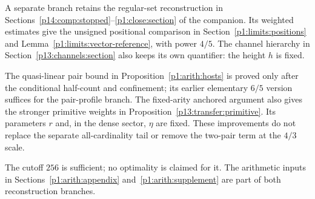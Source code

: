 A separate branch retains the regular-set reconstruction in
Sections~\ref{p14:comp:stopped}--\ref{p1:close:section} of the
companion. Its weighted estimates give the unsigned positional
comparison in Section~\ref{p1:limits:positions} and
Lemma~\ref{p1:limits:vector-reference}, with power \(4/5\).
The channel hierarchy in Section~\ref{p13:channels:section}
also keeps its own quantifier: the height \(h\) is fixed.

The quasi-linear pair bound in Proposition~\ref{p1:arith:hosts} is
proved only after the conditional half-count and confinement; its
earlier elementary $6/5$ version suffices for the pair-profile branch.
The fixed-arity anchored argument also gives the stronger primitive
weights in Proposition~\ref{p13:transfer:primitive}. Its parameters
$r$ and, in the dense sector, $\eta$ are fixed. These improvements
do not replace the separate all-cardinality tail or remove the
two-pair term at the $4/3$ scale.

The cutoff \(256\) is sufficient; no optimality is claimed for it.
The arithmetic inputs in Sections~\ref{p1:arith:appendix}
and~\ref{p1:arith:supplement} are part of both reconstruction branches.

